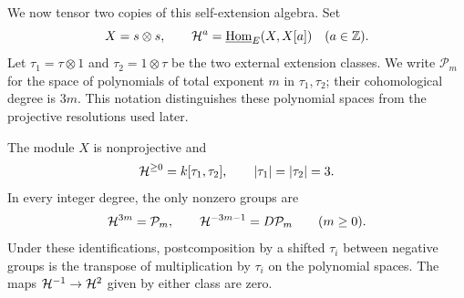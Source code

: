 We now tensor two copies of this self-extension algebra. Set
\begin{equation}
X=s\otimes s,\qquad
\mathcal H^a=\underline{\operatorname{Hom}}_E(X,X[a])\quad(a\in\mathbb Z).
\label{e:stable-groups}
\end{equation}
Let \(\tau_1=\tau\otimes1\) and \(\tau_2=1\otimes\tau\) be the
two external extension classes.  We write \(\mathcal P_m\) for the
space of polynomials of total exponent \(m\) in \(\tau_1,\tau_2\);
their cohomological degree is \(3m\).  This notation distinguishes
these polynomial spaces from the projective resolutions used later.

\begin{proposition}\label{e:all-degrees}
The module \(X\) is nonprojective and
\begin{equation}
\mathcal H^{\ge0}=k[\tau_1,\tau_2],\qquad |\tau_1|=|\tau_2|=3.
\label{e:two-polynomial}
\end{equation}
In every integer degree, the only nonzero groups are
\begin{equation}
\mathcal H^{3m}=\mathcal P_m,\qquad
\mathcal H^{-3m-1}=D\mathcal P_m\qquad(m\ge0).
\label{e:profile}
\end{equation}
Under these identifications, postcomposition by a shifted
\(\tau_i\) between negative groups is the transpose of multiplication
by \(\tau_i\) on the polynomial spaces.  The maps
\(\mathcal H^{-1}\to\mathcal H^2\) given by either class are zero.
\end{proposition}

